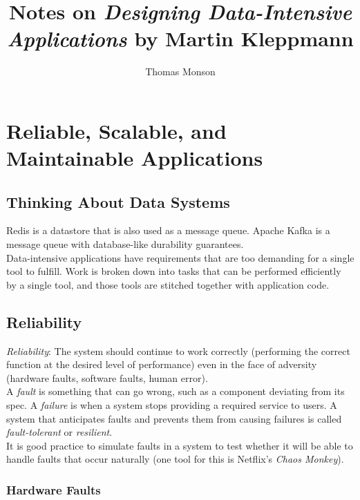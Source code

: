 \documentclass[12pt, titlepage]{article}
\title{Notes on \textit{Designing Data-Intensive Applications} by Martin Kleppmann}
\author{Thomas Monson}
\date{}
\begin{document}
\maketitle

\tableofcontents
\newpage

\section{Reliable, Scalable, and Maintainable Applications}

\subsection{Thinking About Data Systems}

Redis is a datastore that is also used as a message queue. Apache Kafka is a message queue with database-like durability guarantees. \\

Data-intensive applications have requirements that are too demanding for a single tool to fulfill. Work is broken down into tasks that can be performed efficiently by a single tool, and those tools are stitched together with application code.

\subsection{Reliability}

\textit{Reliability}: The system should continue to work correctly (performing the correct function at the desired level of performance) even in the face of adversity (hardware faults, software faults, human error). \\

A \textit{fault} is something that can go wrong, such as a component deviating from its spec. A \textit{failure} is when a system stops providing a required service to users. A system that anticipates faults and prevents them from causing failures is called \textit{fault-tolerant} or \textit{resilient}. \\

It is good practice to simulate faults in a system to test whether it will be able to handle faults that occur naturally (one tool for this is Netflix's \textit{Chaos Monkey}).

\subsubsection{Hardware Faults}
\end{document}
